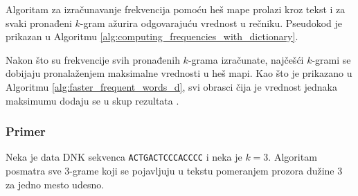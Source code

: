 \documentclass[12pt,oneside]{memoir}
\begin{document}
Algoritam za izračunavanje frekvencija pomoću heš mape prolazi kroz tekst i za svaki pronađeni $k$-gram ažurira odgovarajuću vrednost u rečniku. Pseudokod je prikazan u Algoritmu \ref{alg:computing_frequencies_with_dictionary}.

\begin{algorithm}[h]
\caption{Computing Frequencies With Dictionary}
\label{alg:computing_frequencies_with_dictionary}
\SetAlgoLined
\DontPrintSemicolon
{}
\end{algorithm}

Nakon što su frekvencije svih pronađenih $k$-grama izračunate, najčešći $k$-grami se dobijaju pronalaženjem maksimalne vrednosti u heš mapi. Kao što je prikazano u Algoritmu \ref{alg:faster_frequent_words_d}, svi obrasci čija je vrednost jednaka maksimumu dodaju se u skup rezultata \cite{matf_repo}.  

\begin{algorithm}[h]
\caption{Faster Frequent Words With Dictionary}
\label{alg:faster_frequent_words_d}
\SetAlgoLined
\DontPrintSemicolon
{}
\end{algorithm}

\subsubsection{Primer}

Neka je data DNK sekvenca \texttt{ACTGACTCCCACCCC} i neka je $k = 3$. Algoritam posmatra sve 3-grame koji se pojavljuju u tekstu pomeranjem prozora dužine 3 za jedno mesto udesno.
\end{document}

